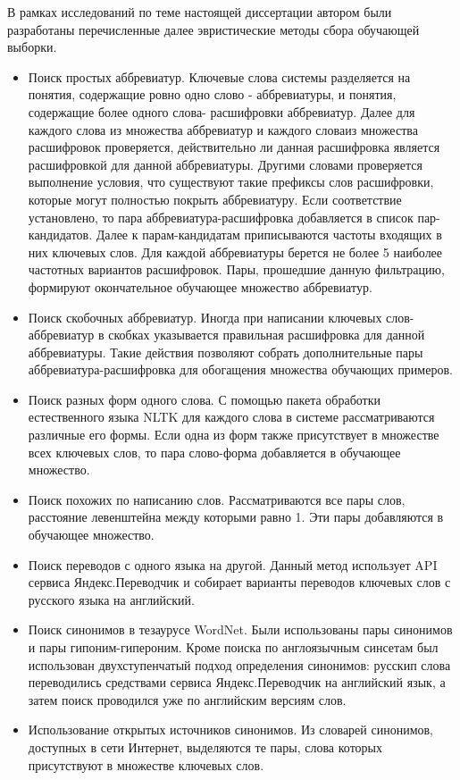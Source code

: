 В рамках исследований по теме настоящей диссертации автором были разработаны перечисленные далее эвристические методы сбора обучающей выборки.
\begin{itemize}
    \item Поиск простых аббревиатур. Ключевые слова системы разделяется на понятия, содержащие ровно одно слово - аббревиатуры, и понятия, содержащие более одного слова- расшифровки аббревиатур. Далее для каждого слова из множества аббревиатур и каждого словаиз множества расшифровок проверяется, действительно ли данная расшифровка является расшифровкой для данной аббревиатуры. Другими словами проверяется выполнение условия, что существуют такие префиксы слов расшифровки, которые могут полностью покрыть аббревиатуру. Если соответствие установлено, то пара аббревиатура-расшифровка добавляется в список пар-кандидатов. Далее к парам-кандидатам приписываются частоты входящих в них ключевых слов. Для каждой аббревиатуры берется не более 5 наиболее частотных вариантов расшифровок. Пары, прошедшие данную фильтрацию, формируют окончательное обучающее множество аббревиатур.
    \item Поиск скобочных аббревиатур. Иногда при написании ключевых слов-аббревиатур в скобках указывается правильная расшифровка для данной аббревиатуры. Такие действия позволяют собрать дополнительные пары аббревиатура-расшифровка для обогащения множества обучающих примеров.
    \item Поиск разных форм одного слова. С помощью пакета обработки естественного языка NLTK для каждого слова в системе рассматриваются различные его формы. Если одна из форм также присутствует в множестве всех ключевых слов, то пара слово-форма добавляется в обучающее множество.
    \item Поиск похожих по написанию слов. Рассматриваются все пары слов, расстояние левенштейна между которыми равно 1. Эти пары добавляются в обучающее множество.
    \item Поиск переводов с одного языка на другой. Данный метод использует API сервиса Яндекс.Переводчик и собирает варианты переводов ключевых слов с русского языка на английский.
    \item Поиск синонимов в тезаурусе WordNet. Были использованы пары синонимов и пары гипоним-гипероним. Кроме поиска по англоязычным синсетам был использован двухступенчатый подход определения синонимов: русскип слова переводились средствами сервиса Яндекс.Переводчик на английский язык, а затем поиск проводился уже по английским версиям слов.
    \item Использование открытых источников синонимов. Из словарей синонимов, доступных в сети Интернет, выделяются те пары, слова которых присутствуют в множестве ключевых слов.
\end{itemize}

